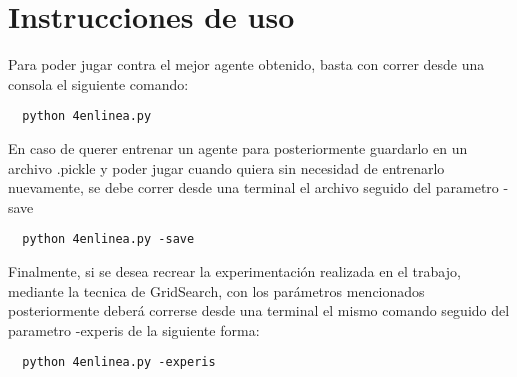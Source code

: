 \section{Instrucciones de uso}
Para poder jugar contra el mejor agente obtenido, basta con correr desde una consola el siguiente comando:
\begin{verbatim}
  python 4enlinea.py
\end{verbatim}
En caso de querer entrenar un agente para posteriormente guardarlo en un archivo .pickle y poder jugar cuando quiera sin necesidad
de entrenarlo nuevamente, se debe correr desde una terminal el archivo seguido del parametro -save
\begin{verbatim}
  python 4enlinea.py -save
\end{verbatim}
Finalmente, si se desea recrear la experimentación realizada en el trabajo, mediante la tecnica de GridSearch, con los parámetros mencionados
posteriormente deberá correrse desde una terminal el mismo comando seguido del parametro -experis de la siguiente forma:
\begin{verbatim}
  python 4enlinea.py -experis
\end{verbatim}
%
%
%
%
%
%
%
